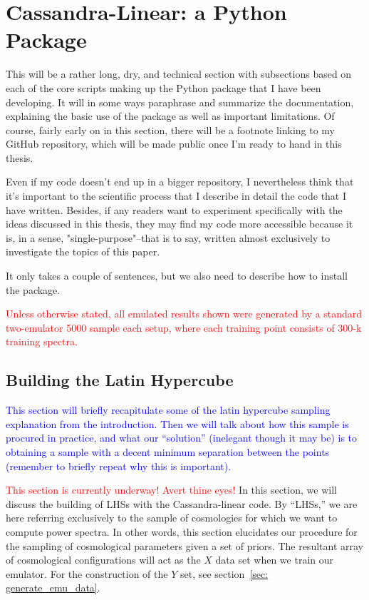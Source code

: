 \chapter{Cassandra-Linear: a Python Package}

This will be a rather long, dry, and technical section with subsections based on each of the core scripts making up the Python package that I have been developing. It will in some ways paraphrase and summarize the documentation, explaining the basic use of the package as well as important limitations. Of course, fairly early on in this section, there will be a footnote linking to my GitHub repository, which will be made public once I'm ready to hand in this thesis.

Even if my code doesn't end up in a bigger repository, I nevertheless think that it's important to the scientific process that I describe in detail the code that I have written. Besides, if any readers want to experiment specifically with the ideas discussed in this thesis, they may find my code more accessible because it is, in a sense, "single-purpose"--that is to say, written almost exclusively to investigate the topics of this paper.

It only takes a couple of sentences, but we also need to describe how to install the package.

\textcolor{red}{Unless otherwise stated, all emulated results shown were generated by a standard two-emulator 5000 sample each setup, where each training point consists of 300-k training spectra.}

\section{Building the Latin Hypercube}
\label{sec: build_lhc}


\textcolor{blue}{This section will briefly recapitulate some of the latin hypercube sampling
explanation from the introduction. Then we will talk about how this sample is
procured in practice, and what our ``solution'' (inelegant though it may be)
is to obtaining a sample with a decent minimum separation between the points
(remember to briefly repeat why this is important).}

\textcolor{red}{This section is currently underway! Avert thine eyes!}
In this section, we will discuss the building of LHSs with the
Cassandra-linear code. By ``LHSs,'' we are here referring exclusively to the
sample of cosmologies for which we want to compute power spectra. In other 
words, this section elucidates our procedure for the sampling of cosmological 
parameters given a set of priors. The resultant array of cosmological
configurations will act as the $X$ data set when we train our emulator. For 
the construction of the $Y$ set, see section~\ref{sec: generate_emu_data}.

